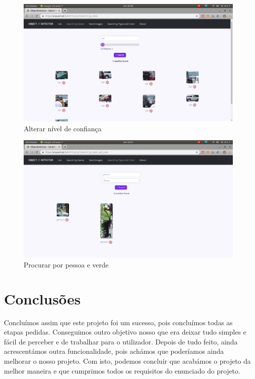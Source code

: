 \documentclass{report}
\begin{document}
\vspace{5mm}
\begin{figure}[!ht]
    \centering
    \includegraphics[scale = 0.3]{confidence.png}
    \caption{Alterar nível de confiança}
    \label{fig:confidence}
\end{figure}
\vspace{5mm}
\begin{figure}[!ht]
    \centering
    \includegraphics[scale = 0.3]{Typecolor.png}
    \caption{Procurar por pessoa e verde}
    \label{fig:persongreen}
\end{figure}


\chapter{Conclusões}
\label{chap.conclusao}
Concluímos assim que este projeto foi um sucesso, pois concluímos todas as etapas pedidas. Conseguimos outro objetivo nosso que era deixar tudo simples e fácil de perceber e de trabalhar para o utilizador. Depois de tudo feito, ainda acrescentámos outra funcionalidade, pois achámos que poderíamos ainda melhorar o nosso projeto. Com isto, podemos concluir que acabámos o projeto da melhor maneira e que cumprimos todos os requisitos do enunciado do projeto.
\end{document}
